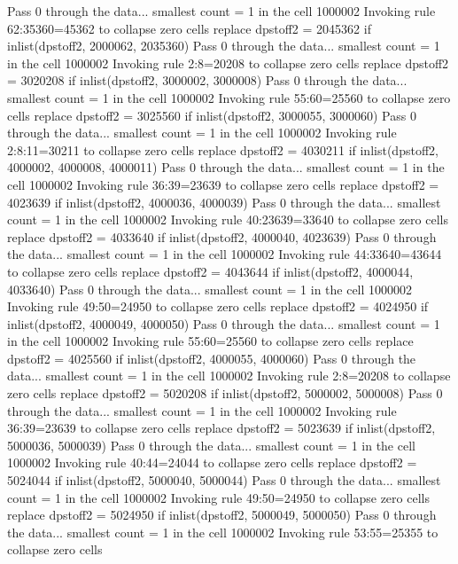 Pass 0 through the data...
  smallest count = 1 in the cell      1000002
  Invoking rule 62:35360=45362 to collapse zero cells
  replace dpstoff2 = 2045362 if inlist(dpstoff2, 2000062, 2035360)
Pass 0 through the data...
  smallest count = 1 in the cell      1000002
  Invoking rule 2:8=20208 to collapse zero cells
  replace dpstoff2 = 3020208 if inlist(dpstoff2, 3000002, 3000008)
Pass 0 through the data...
  smallest count = 1 in the cell      1000002
  Invoking rule 55:60=25560 to collapse zero cells
  replace dpstoff2 = 3025560 if inlist(dpstoff2, 3000055, 3000060)
Pass 0 through the data...
  smallest count = 1 in the cell      1000002
  Invoking rule 2:8:11=30211 to collapse zero cells
  replace dpstoff2 = 4030211 if inlist(dpstoff2, 4000002, 4000008, 4000011)
Pass 0 through the data...
  smallest count = 1 in the cell      1000002
  Invoking rule 36:39=23639 to collapse zero cells
  replace dpstoff2 = 4023639 if inlist(dpstoff2, 4000036, 4000039)
Pass 0 through the data...
  smallest count = 1 in the cell      1000002
  Invoking rule 40:23639=33640 to collapse zero cells
  replace dpstoff2 = 4033640 if inlist(dpstoff2, 4000040, 4023639)
Pass 0 through the data...
  smallest count = 1 in the cell      1000002
  Invoking rule 44:33640=43644 to collapse zero cells
  replace dpstoff2 = 4043644 if inlist(dpstoff2, 4000044, 4033640)
Pass 0 through the data...
  smallest count = 1 in the cell      1000002
  Invoking rule 49:50=24950 to collapse zero cells
  replace dpstoff2 = 4024950 if inlist(dpstoff2, 4000049, 4000050)
Pass 0 through the data...
  smallest count = 1 in the cell      1000002
  Invoking rule 55:60=25560 to collapse zero cells
  replace dpstoff2 = 4025560 if inlist(dpstoff2, 4000055, 4000060)
Pass 0 through the data...
  smallest count = 1 in the cell      1000002
  Invoking rule 2:8=20208 to collapse zero cells
  replace dpstoff2 = 5020208 if inlist(dpstoff2, 5000002, 5000008)
Pass 0 through the data...
  smallest count = 1 in the cell      1000002
  Invoking rule 36:39=23639 to collapse zero cells
  replace dpstoff2 = 5023639 if inlist(dpstoff2, 5000036, 5000039)
Pass 0 through the data...
  smallest count = 1 in the cell      1000002
  Invoking rule 40:44=24044 to collapse zero cells
  replace dpstoff2 = 5024044 if inlist(dpstoff2, 5000040, 5000044)
Pass 0 through the data...
  smallest count = 1 in the cell      1000002
  Invoking rule 49:50=24950 to collapse zero cells
  replace dpstoff2 = 5024950 if inlist(dpstoff2, 5000049, 5000050)
Pass 0 through the data...
  smallest count = 1 in the cell      1000002
  Invoking rule 53:55=25355 to collapse zero cells
